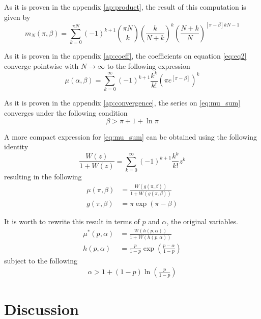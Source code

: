 \documentclass{article}
\newcommand{\ppar}[1]{\left( #1 \right)}
\newcommand{\spar}[1]{\left[ #1 \right]}
\begin{document}
As it is proven in the appendix \ref{ap:product}, the result of this computation is given by
\begin{equation}
m_N(\pi, \beta) =
    \sum_{k=0}^{\pi N}
    (-1)^{k+1} 
    \binom{\pi N}{k}
    \ppar{\frac{k}{N+k}}^k
    \ppar{\frac{N+k}{N}}^{\spar{\pi-\beta}k N -1}
    \label{eq:eq2}
\end{equation}

As it is proven in the appendix \ref{ap:coeff}, the coefficients on equation \eqref{eq:eq2} converge pointwise with $N\rightarrow \infty$ to the following expression
\begin{equation}
    \mu(\alpha, \beta) =
    \sum_{k=0}^{\infty}
    (-1)^{k+1} \frac{k^k}{k!} 
    \ppar{\pi
    e^{\spar{\pi-\beta}} }^k
    \label{eq:mu_sum}
\end{equation}

As it is proven in the appendix \ref{ap:convergence},
the series on \eqref{eq:mu_sum} converges under the following condition
\begin{equation}
    \beta > \pi + 1 + \ln{\pi}
\end{equation}

A more compact expression for \eqref{eq:mu_sum} can be obtained using the following identity
\begin{equation}
    \frac{W\ppar{z}}{1+W\ppar{z}}
    =
    \sum_{k=0}^{\infty}
    (-1)^{k+1} \frac{k^k}{k!} 
    z^k
\end{equation}
resulting in the following 
\begin{align}
    \mu\ppar{\pi, \beta} &= \frac{W\ppar{g\ppar{\pi, \beta}}}{1+W\ppar{g\ppar{\pi, \beta}}}
    \\
    g\ppar{\pi, \beta} &=
    \pi \exp{\ppar{\pi - \beta}}
\end{align}

It is worth to rewrite this result in terms of $p$ and $\alpha$, the original variables.
\begin{align}
    {\mu^*}\ppar{p, \alpha} &= \frac{W\ppar{h\ppar{p, \alpha}}}{1+W\ppar{h\ppar{p, \alpha}}}
    \\
    h\ppar{p, \alpha} &=
    \frac{p}{1-p} \exp{\ppar{\frac{p-\alpha}{1-p}}}
\end{align}
subject to the following
\begin{align}
    \alpha > 1 + \ppar{1-p} \ln{\ppar{\frac{p}{1-p}}} 
    \label{eq:conv_og}
\end{align}

\section{Discussion}
\end{document}
